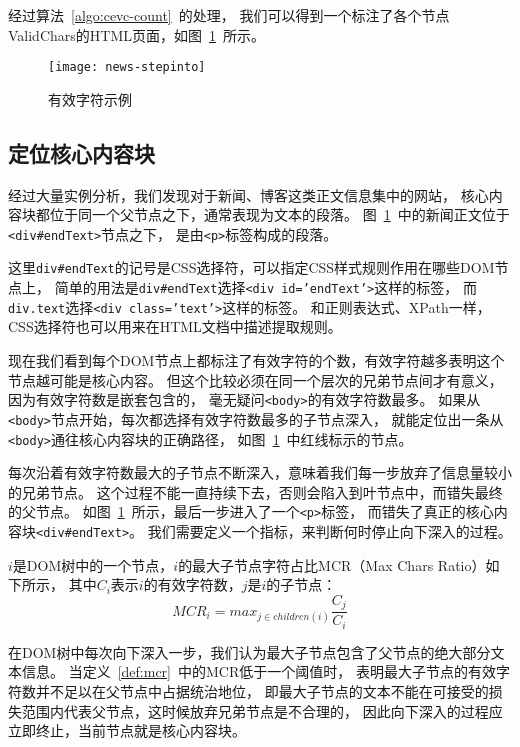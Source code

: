 经过算法~\ref{algo:cevc-count}~的处理，
我们可以得到一个标注了各个节点ValidChars的HTML页面，如图~\ref{fig:news-stepinto}~所示。

\begin{figure}[t]
\centering
\texttt{[image: news-stepinto]}
\caption{有效字符示例}
\label{fig:news-stepinto}
\end{figure}

\subsection{定位核心内容块}
经过大量实例分析，我们发现对于新闻、博客这类正文信息集中的网站，
核心内容块都位于同一个父节点之下，通常表现为文本的段落。
图~\ref{fig:news-stepinto}~中的新闻正文位于\texttt{<div\#endText>}节点之下，
是由\texttt{<p>}标签构成的段落。

这里\texttt{div\#endText}的记号是CSS选择符，可以指定CSS样式规则作用在哪些DOM节点上，
简单的用法是\texttt{div\#endText}选择\texttt{<div id='endText'>}这样的标签，
而\texttt{div.text}选择\texttt{<div class='text'>}这样的标签。
和正则表达式、XPath一样，CSS选择符也可以用来在HTML文档中描述提取规则。

现在我们看到每个DOM节点上都标注了有效字符的个数，有效字符越多表明这个节点越可能是核心内容。
但这个比较必须在同一个层次的兄弟节点间才有意义，因为有效字符数是嵌套包含的，
毫无疑问\texttt{<body>}的有效字符数最多。
如果从\texttt{<body>}节点开始，每次都选择有效字符数最多的子节点深入，
就能定位出一条从\texttt{<body>}通往核心内容块的正确路径，
如图~\ref{fig:news-stepinto}~中红线标示的节点。

每次沿着有效字符数最大的子节点不断深入，意味着我们每一步放弃了信息量较小的兄弟节点。
这个过程不能一直持续下去，否则会陷入到叶节点中，而错失最终的父节点。
如图~\ref{fig:news-stepinto}~所示，最后一步进入了一个\texttt{<p>}标签，
而错失了真正的核心内容块\texttt{<div\#endText>}。
我们需要定义一个指标，来判断何时停止向下深入的过程。

\begin{definition}
\label{def:mcr}
$i$是DOM树中的一个节点，$i$的最大子节点字符占比MCR（Max Chars Ratio）如下所示，
其中$C_i$表示$i$的有效字符数，$j$是$i$的子节点：
\begin{equation}
MCR_i = max_{j \in children(i)} \frac{C_j}{C_i}
\end{equation}
\end{definition}

在DOM树中每次向下深入一步，我们认为最大子节点包含了父节点的绝大部分文本信息。
当定义~\ref{def:mcr}~中的MCR低于一个阈值时，
表明最大子节点的有效字符数并不足以在父节点中占据统治地位，
即最大子节点的文本不能在可接受的损失范围内代表父节点，这时候放弃兄弟节点是不合理的，
因此向下深入的过程应立即终止，当前节点就是核心内容块。

